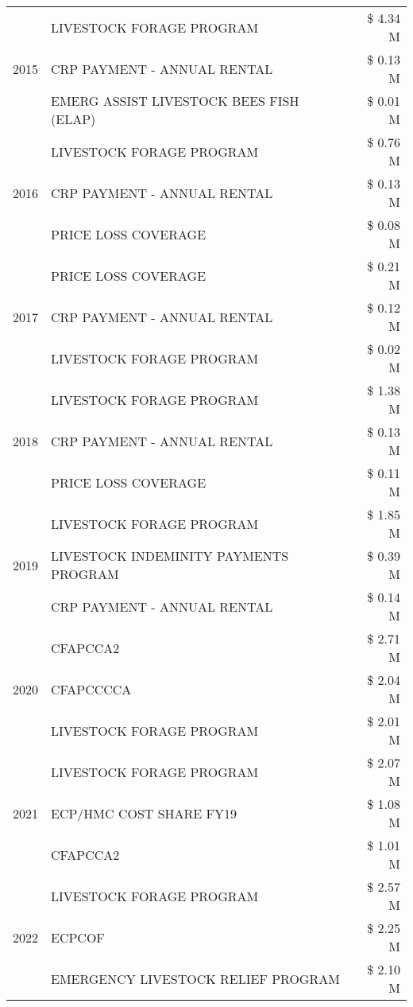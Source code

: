 \begin{tabular}{llr}
\cline{1-3}
\multirow[t]{3}{*}{2015} & LIVESTOCK FORAGE PROGRAM & \$ 4.34 M \\
 & CRP PAYMENT - ANNUAL RENTAL & \$ 0.13 M \\
 & EMERG ASSIST LIVESTOCK BEES FISH (ELAP) & \$ 0.01 M \\
\cline{1-3}
\multirow[t]{3}{*}{2016} & LIVESTOCK FORAGE PROGRAM & \$ 0.76 M \\
 & CRP PAYMENT - ANNUAL RENTAL & \$ 0.13 M \\
 & PRICE LOSS COVERAGE & \$ 0.08 M \\
\cline{1-3}
\multirow[t]{3}{*}{2017} & PRICE LOSS COVERAGE & \$ 0.21 M \\
 & CRP PAYMENT - ANNUAL RENTAL & \$ 0.12 M \\
 & LIVESTOCK FORAGE PROGRAM & \$ 0.02 M \\
\cline{1-3}
\multirow[t]{3}{*}{2018} & LIVESTOCK FORAGE PROGRAM & \$ 1.38 M \\
 & CRP PAYMENT - ANNUAL RENTAL & \$ 0.13 M \\
 & PRICE LOSS COVERAGE & \$ 0.11 M \\
\cline{1-3}
\multirow[t]{3}{*}{2019} & LIVESTOCK FORAGE PROGRAM & \$ 1.85 M \\
 & LIVESTOCK INDEMINITY PAYMENTS PROGRAM & \$ 0.39 M \\
 & CRP PAYMENT - ANNUAL RENTAL & \$ 0.14 M \\
\cline{1-3}
\multirow[t]{3}{*}{2020} & CFAPCCA2 & \$ 2.71 M \\
 & CFAPCCCCA & \$ 2.04 M \\
 & LIVESTOCK FORAGE PROGRAM & \$ 2.01 M \\
\cline{1-3}
\multirow[t]{3}{*}{2021} & LIVESTOCK FORAGE PROGRAM & \$ 2.07 M \\
 & ECP/HMC COST SHARE FY19 & \$ 1.08 M \\
 & CFAPCCA2 & \$ 1.01 M \\
\cline{1-3}
\multirow[t]{3}{*}{2022} & LIVESTOCK FORAGE PROGRAM & \$ 2.57 M \\
 & ECPCOF & \$ 2.25 M \\
 & EMERGENCY LIVESTOCK RELIEF PROGRAM & \$ 2.10 M \\
\cline{1-3}
\bottomrule
\end{tabular}
